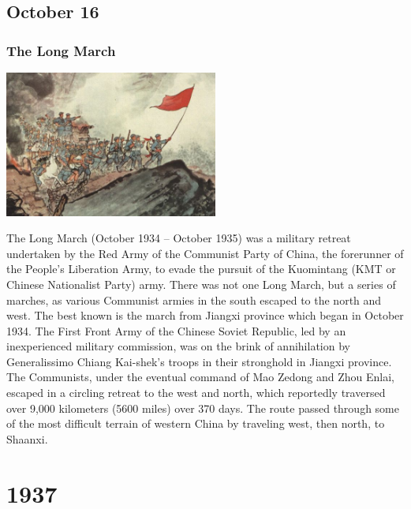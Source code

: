 \documentclass[11pt]{report}
\begin{document}
\section{October 16}
\subsection{The Long March}
\vspace{2mm}\begin{center}\includegraphics[width=7cm]{./img/longMarch.jpg}\end{center}
The Long March (October 1934 – October 1935) was a military retreat undertaken by the Red Army of the Communist Party of China, the forerunner of the People's Liberation Army, to evade the pursuit of the Kuomintang (KMT or Chinese Nationalist Party) army. There was not one Long March, but a series of marches, as various Communist armies in the south escaped to the north and west. The best known is the march from Jiangxi province which began in October 1934. The First Front Army of the Chinese Soviet Republic, led by an inexperienced military commission, was on the brink of annihilation by Generalissimo Chiang Kai-shek's troops in their stronghold in Jiangxi province. The Communists, under the eventual command of Mao Zedong and Zhou Enlai, escaped in a circling retreat to the west and north, which reportedly traversed over 9,000 kilometers (5600 miles) over 370 days. The route passed through some of the most difficult terrain of western China by traveling west, then north, to Shaanxi.

\chapter{1937}
\section{}
\end{document}
